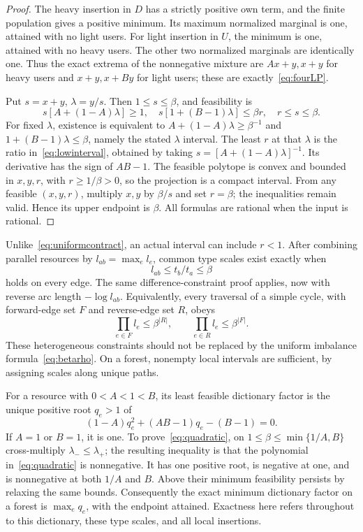 \documentclass[manuscript,review,anonymous]{acmart}
\begin{document}
\begin{proof}
The heavy insertion in $D$ has a strictly positive own term, and the finite population gives a positive minimum. Its maximum normalized marginal is one, attained with no light users. For light insertion in $U$, the minimum is one, attained with no heavy users. The other two normalized marginals are identically one. Thus the exact extrema of the nonnegative mixture are $Ax+y,x+y$ for heavy users and $x+y,x+By$ for light users; these are exactly~\eqref{eq:fourLP}.

Put $s=x+y$, $\lambda=y/s$. Then $1\le s\le\beta$, and feasibility is
\[
 s[A+(1-A)\lambda]\ge1,\quad
 s[1+(B-1)\lambda]\le\beta r,\quad r\le s\le\beta.
\]
For fixed $\lambda$, existence is equivalent to $A+(1-A)\lambda\ge\beta^{-1}$ and $1+(B-1)\lambda\le\beta$, namely the stated $\lambda$ interval. The least $r$ at that $\lambda$ is the ratio in~\eqref{eq:lowinterval}, obtained by taking $s=[A+(1-A)\lambda]^{-1}$. Its derivative has the sign of $AB-1$. The feasible polytope is convex and bounded in $x,y,r$, with $r\ge1/\beta>0$, so the projection is a compact interval. From any feasible $(x,y,r)$, multiply $x,y$ by $\beta/s$ and set $r=\beta$; the inequalities remain valid. Hence its upper endpoint is $\beta$. All formulas are rational when the input is rational.
\end{proof}
Unlike~\eqref{eq:uniformcontract}, an actual interval can include $r<1$. After combining parallel resources by $l_{ab}=\max_e l_e$, common type scales exist exactly when
\begin{equation}\label{eq:heterogeneous}
 l_{ab}\le t_b/t_a\le\beta
\end{equation}
holds on every edge. The same difference-constraint proof applies, now with reverse arc length $-\log l_{ab}$. Equivalently, every traversal of a simple cycle, with forward-edge set $F$ and reverse-edge set $R$, obeys
\[
 \prod_{e\in F}l_e\le\beta^{|R|},\qquad
 \prod_{e\in R}l_e\le\beta^{|F|}.
\]
These heterogeneous constraints should not be replaced by the uniform imbalance formula~\eqref{eq:betarho}. On a forest, nonempty local intervals are sufficient, by assigning scales along unique paths.

For a resource with $0<A<1<B$, its least feasible dictionary factor is the unique positive root $q_e>1$ of
\begin{equation}\label{eq:quadratic}
 (1-A)q_e^2+(AB-1)q_e-(B-1)=0.
\end{equation}
If $A=1$ or $B=1$, it is one. To prove~\eqref{eq:quadratic}, on $1\le\beta\le\min\{1/A,B\}$ cross-multiply $\lambda_-\le\lambda_+$; the resulting inequality is that the polynomial in~\eqref{eq:quadratic} is nonnegative. It has one positive root, is negative at one, and is nonnegative at both $1/A$ and $B$. Above their minimum feasibility persists by relaxing the same bounds. Consequently the exact minimum dictionary factor on a forest is $\max_eq_e$, with the endpoint attained. Exactness here refers throughout to this dictionary, these type scales, and all local insertions.
\end{document}
